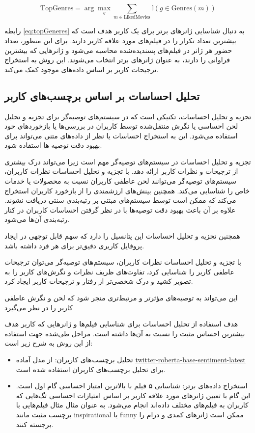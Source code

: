 \begin{enumerate}
\begin{LTR}
\begin{equation}
\label{eq:topGeneres}
\text{TopGenres} = \arg\max_{g} \sum_{m \in \text{LikedMovies}} \mathbb{I}(g \in \text{Genres}(m))
\end{equation}
\end{LTR}

رابطه%
\ref{eq:topGeneres} 
 به دنبال شناسایی ژانرهای برتر برای یک کاربر هدف است که بیشترین تعداد تکرار را در فیلم‌های مورد علاقه کاربر دارند. برای این منظور، تعداد حضور هر ژانر در فیلم‌های پسندیده‌شده محاسبه می‌شود و ژانرهایی که بیشترین فراوانی را دارند، به عنوان ژانرهای برتر انتخاب می‌شوند. این روش به استخراج ترجیحات کاربر بر اساس داده‌های موجود کمک می‌کند.


\subsection{تحلیل احساسات بر اساس برچسب‌های کاربر}
تجزیه و تحلیل احساسات، تکنیکی است که در سیستم‌های توصیه‌گر برای تجزیه و تحلیل لحن احساسی یا نگرش منتقل‌شده توسط کاربران در بررسی‌ها یا بازخوردهای خود استفاده می‌شود. این به استخراج احساسات یا نظر از داده‌های متنی می‌تواند برای بهبود دقت توصیه ها استفاده شود.

تجزیه و تحلیل احساسات در سیستم‌های توصیه‌گر مهم است زیرا می‌تواند درک بیشتری از ترجیحات و نظرات کاربر ارائه دهد. با تجزیه و تحلیل احساسات نظرات کاربران، سیستم‌های توصیه‌گر می‌توانند لحن عاطفی کاربران نسبت به محصولات یا خدمات خاص را شناسایی می‌کند. همچنین بینش‌های ارزشمندی را از بازخورد کاربران استخراج می‌کند که ممکن است توسط سیستم‌های مبتنی بر رتبه‌بندی سنتی دریافت نشوند. علاوه بر آن باعث بهبود دقت توصیه‌ها با در نظر گرفتن احساسات کاربران در کنار رتبه‌بندی آن‌ها می‌شود.

همچنین تجزیه و تحلیل احساسات این پتانسیل را دارد که سهم قابل توجهی در ایجاد پروفایل کاربری دقیق‌تر برای هر فرد داشته باشد. 

با تجزیه و تحلیل احساسات نظرات کاربران، سیستم‌های توصیه‌گر می‌توان ترجیحات عاطفی کاربر را شناسایی کرد، تفاوت‌های ظریف نظرات و نگرش‌های کاربر را به تصویر کشید و  درک شخصی‌تر از رفتار و ترجیحات کاربر ایجاد کرد.

این می‌تواند به توصیه‌های مؤثرتر و مرتبط‌تری منجر شود که لحن و نگرش عاطفی کاربر را در نظر می‌گیرد
\cite{elahi2023hybrid}


هدف استفاده از تحلیل احساسات برای شناسایی فیلم‌ها و ژانرهایی که کاربر هدف بیشترین احساس مثبت را نسبت به آن‌ها داشته است.
مراحل طی‌شده جهت استفاده از این روش به شرح زیر است:
\begin{itemize}
\item
تحلیل برچسب های کاربران:
از مدل آماده 
\href{https://huggingface.co/cardiffnlp/twitter-roberta-base-sentiment-latest}{twitter-roberta-base-sentiment-latest}
 برای تحلیل برچسب‌های کاربران استفاده شده است.
\item
استخراج داده‌های برتر:
شناسایی ۵ فیلم با بالاترین امتیاز احساسی گام اول است. این گام با تعیین ژانرهای مورد علاقه کاربر بر اساس امتیازات احساسی تگ‌هایی که کاربران به فیلم‌های مختلف داده‌اند انجام می‌شود.
 به عنوان مثال مثال فیلم‌هایی با برچسب مثبت مانند inspirational یا funny ممکن است ژانرهای کمدی و درام را برجسته کنند.



\end{itemize}
\end{enumerate}
